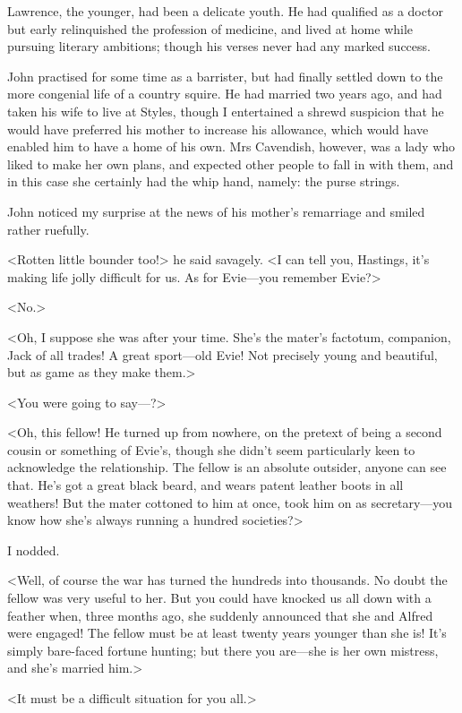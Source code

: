  Lawrence, the younger, had been a delicate youth. He had qualified as a doctor but early relinquished the profession of medicine, and lived at home while pursuing literary ambitions; though his verses never had any marked success. 

 John practised for some time as a barrister, but had finally settled down to the more congenial life of a country squire. He had married two years ago, and had taken his wife to live at Styles, though I entertained a shrewd suspicion that he would have preferred his mother to increase his allowance, which would have enabled him to have a home of his own. Mrs Cavendish, however, was a lady who liked to make her own plans, and expected other people to fall in with them, and in this case she certainly had the whip hand, namely: the purse strings. 

 John noticed my surprise at the news of his mother's remarriage and smiled rather ruefully. 

 <Rotten little bounder too!> he said savagely. <I can tell you, Hastings, it's making life jolly difficult for us. As for Evie—you remember Evie?> 

 <No.> 

 <Oh, I suppose she was after your time. She's the mater's factotum, companion, Jack of all trades! A great sport—old Evie! Not precisely young and beautiful, but as game as they make them.> 

 <You were going to say—?> 

 <Oh, this fellow! He turned up from nowhere, on the pretext of being a second cousin or something of Evie's, though she didn't seem particularly keen to acknowledge the relationship. The fellow is an absolute outsider, anyone can see that. He's got a great black beard, and wears patent leather boots in all weathers! But the mater cottoned to him at once, took him on as secretary—you know how she's always running a hundred societies?> 

 I nodded. 

 <Well, of course the war has turned the hundreds into thousands. No doubt the fellow was very useful to her. But you could have knocked us all down with a feather when, three months ago, she suddenly announced that she and Alfred were engaged! The fellow must be at least twenty years younger than she is! It's simply bare-faced fortune hunting; but there you are—she is her own mistress, and she's married him.> 

 <It must be a difficult situation for you all.> 

